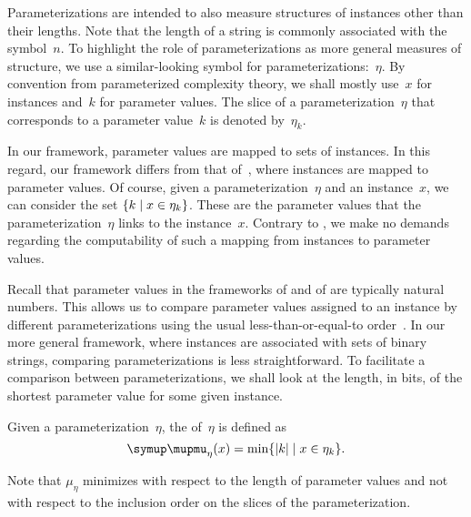 Parameterizations are intended to also measure structures of instances other than their lengths.
Note that the length of a string is commonly associated with the symbol~$n$.
To highlight the role of parameterizations as more general measures of structure, we use a similar-looking symbol for parameterizations:~$\eta$.
By convention from parameterized complexity theory, we shall mostly use~$x$ for instances and~$k$ for parameter values.
The slice of a parameterization~$\eta$ that corresponds to a parameter value~$k$ is denoted by~$\eta_k$.

In our framework, parameter values are mapped to sets of instances.
In this regard, our framework differs from that of~\textcite{flum2006parameterized}, where instances are mapped to parameter values.
Of course, given a parameterization~$\eta$ and an instance~$x$, we can consider the set $\{k \;|\; x \in \eta_k\}$.
These are the parameter values that the parameterization~$\eta$ links to the instance~$x$.
Contrary to \citeauthor{flum2006parameterized}, we make no demands regarding the computability of such a mapping from instances to parameter values.

Recall that parameter values in the frameworks of \textcite{downey1999parameterized} and of \textcite{flum2006parameterized} are typically natural numbers.
This allows us to compare parameter values assigned to an instance by different parameterizations using the usual less-than-or-equal-to order~\parencite{komusiewicz2012new}.
In our more general framework, where instances are associated with sets of binary strings, comparing parameterizations is less straightforward.
To facilitate a comparison between parameterizations, we shall look at the length, in bits, of the shortest parameter value for some given instance.
\begin{definition}
  Given a parameterization~$\eta$, the  of~$\eta$ is defined as
  \begin{equation*}
    \mu_\eta(x) \deq \min\{\length{k} \st x \in \eta_k\}.
  \end{equation*}
\end{definition}
Note that $\mu_\eta$ minimizes with respect to the length of parameter values and not with respect to the inclusion order on the slices of the parameterization.

